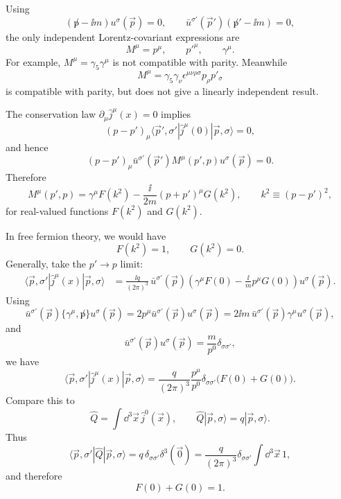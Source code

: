 Using
\[
  (\not p-\ii m)u^\sigma(\vec p)=0,
  \qquad
  \bar u^{\sigma'}(\vec p')(\not p'-\ii m)=0,
\]
the only independent Lorentz-covariant expressions are
\[
  M^\mu=p^\mu,\qquad p'^\mu,\qquad \gamma^\mu.
\]
For example, \(M^\mu=\gamma_5\gamma^\mu\) is not compatible with parity.
Meanwhile
\[
  M^\mu=\gamma_5\gamma_\nu
  \epsilon^{\mu\nu\rho\sigma}p_\rho p'_\sigma
\]
is compatible with parity, but does not give a linearly independent result.

The conservation law \(\partial_\mu\widehat j^\mu(x)=0\) implies
\[
  (p-p')_\mu
  \langle \vec p',\sigma'|\widehat j^\mu(0)|\vec p,\sigma\rangle=0,
\]
and hence
\[
  (p-p')_\mu
  \bar u^{\sigma'}(\vec p')M^\mu(p',p)u^\sigma(\vec p)=0.
\]
Therefore
\[
  M^\mu(p',p)
  =
  \gamma^\mu F(k^2)
  -\frac{\ii}{2m}(p+p')^\mu G(k^2),
  \qquad
  k^2\equiv(p-p')^2,
\]
for real-valued functions \(F(k^2)\) and \(G(k^2)\).

In free fermion theory, we would have
\[
  F(k^2)=1,\qquad G(k^2)=0.
\]
Generally, take the \(p'\to p\) limit:
\[
\begin{aligned}
  \langle \vec p,\sigma'|\widehat j^\mu(x)|\vec p,\sigma\rangle
  &=
  \frac{\ii q}{(2\pi)^3}\,
  \bar u^{\sigma'}(\vec p)
  \left(\gamma^\mu F(0)-\frac{\ii}{m}p^\mu G(0)\right)
  u^\sigma(\vec p).
\end{aligned}
\]
Using
\[
  \bar u^{\sigma'}(\vec p)\{\gamma^\mu,\not p\}u^\sigma(\vec p)
  =
  2p^\mu\bar u^{\sigma'}(\vec p)u^\sigma(\vec p)
  =
  2\ii m\,\bar u^{\sigma'}(\vec p)\gamma^\mu u^\sigma(\vec p),
\]
and
\[
  \bar u^{\sigma'}(\vec p)u^\sigma(\vec p)
  =
  \frac{m}{p^0}\delta_{\sigma\sigma'},
\]
we have
\[
  \langle \vec p,\sigma'|\widehat j^\mu(x)|\vec p,\sigma\rangle
  =
  \frac{q}{(2\pi)^3}
  \frac{p^\mu}{p^0}\delta_{\sigma\sigma'}\bigl(F(0)+G(0)\bigr).
\]
Compare this to
\[
  \widehat Q=\int\dd^3\vec x\,\widehat j^0(\vec x),
  \qquad
  \widehat Q|\vec p,\sigma\rangle=q|\vec p,\sigma\rangle .
\]
Thus
\[
  \langle \vec p,\sigma'|\widehat Q|\vec p,\sigma\rangle
  =
  q\,\delta_{\sigma\sigma'}\delta^3(\vec 0)
  =
  \frac{q}{(2\pi)^3}\delta_{\sigma\sigma'}
  \int\dd^3\vec x\,1,
\]
and therefore
\[
  F(0)+G(0)=1.
\]

